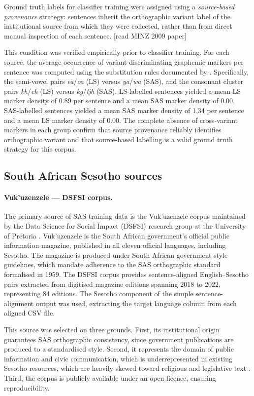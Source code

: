 \documentclass[12pt]{ThesisRU}
\begin{document}
Ground truth labels for classifier training were assigned using a
\textit{source-based provenance} strategy: sentences inherit the orthographic
variant label of the institutional source from which they were collected, rather
than from direct manual inspection of each sentence. [read MINZ 2009 paper]

This condition was verified empirically prior to classifier training. For each
source, the average occurrence of variant-discriminating graphemic markers
per sentence was computed using the substitution rules documented by
\citet{makutoane2022people}. Specifically, the semi-vowel pairs
\textit{ea}/\textit{oa} (LS) versus \textit{ya}/\textit{wa} (SAS), and
the consonant cluster pairs \textit{kh}/\textit{ch} (LS) versus
\textit{kg}/\textit{tjh} (SAS). LS-labelled sentences yielded a mean LS
marker density of 0.89 per sentence and a mean SAS marker density of 0.00.
SAS-labelled sentences yielded a mean SAS marker density of 1.34 per sentence
and a mean LS marker density of 0.00. The complete absence of cross-variant
markers in each group confirm that source provenance reliably identifies
orthographic variant and that source-based labelling is a valid ground truth
strategy for this corpus.

\subsection{South African Sesotho sources}

\paragraph{Vuk'uzenzele — DSFSI corpus.}
The primary source of SAS training data is the Vuk'uzenzele corpus maintained
by the Data Science for Social Impact (DSFSI) research group at the University
of Pretoria \citep{marivate2020investigating}. Vuk'uzenzele is the South African
government's official public information magazine, published in all eleven
official languages, including Sesotho. The magazine is produced under South
African government style guidelines, which mandate adherence to the SAS
orthographic standard formalised in 1959. The DSFSI corpus provides
sentence-aligned English--Sesotho pairs extracted from digitised magazine
editions spanning 2018 to 2022, representing 84 editions. The Sesotho component
of the simple sentence-alignment output was used, extracting the target language
column from each aligned CSV file.

This source was selected on three grounds. First, its institutional origin
guarantees SAS orthographic consistency, since government publications are
produced to a standardised style. Second, it represents the domain of public
information and civic communication, which is underrepresented in existing
Sesotho resources, which are heavily skewed toward religious and legislative
text \citep{kwon2026afroscope}. Third, the corpus is publicly available under an
open licence, ensuring reproducibility.
\end{document}
